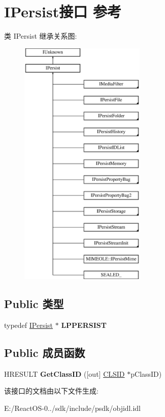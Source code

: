 \hypertarget{interface_i_persist}{}\section{I\+Persist接口 参考}
\label{interface_i_persist}
类 I\+Persist 继承关系图\+:\begin{figure}[H]
\begin{center}
\leavevmode
\includegraphics[height=12.000000cm]{interface_i_persist}
\end{center}
\end{figure}
\subsection*{Public 类型}
\begin{DoxyCompactItemize}
\item 
\mbox{\label{interface_i_persist_a687ceef44a96d253c5bc83e201edd93c}} 
typedef \hyperlink{interface_i_persist}{I\+Persist} $\ast$ {\bfseries L\+P\+P\+E\+R\+S\+I\+ST}
\end{DoxyCompactItemize}
\subsection*{Public 成员函数}
\begin{DoxyCompactItemize}
\item 
\mbox{\label{interface_i_persist_a898270b681e7e646ab96df1916470b16}} 
H\+R\+E\+S\+U\+LT {\bfseries Get\+Class\+ID} (\mbox{[}out\mbox{]} \hyperlink{struct___i_i_d}{C\+L\+S\+ID} $\ast$p\+Class\+ID)
\end{DoxyCompactItemize}


该接口的文档由以下文件生成\+:\begin{DoxyCompactItemize}
\item 
E\+:/\+React\+O\+S-\/0../sdk/include/psdk/objidl.\+idl\end{DoxyCompactItemize}
